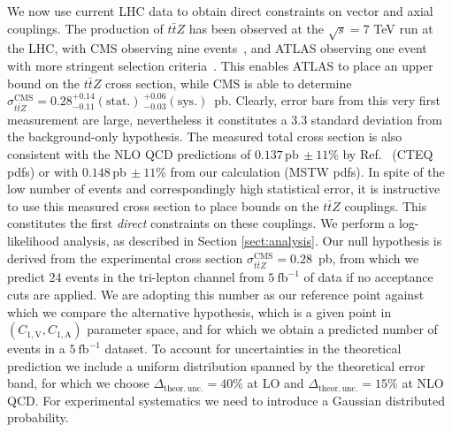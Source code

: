 \documentclass{JHEP3}
\def\ttbZ{t\bar{t}Z}
\def\invfb {\mathrm{fb}^{-1}}
\def\ConeA{C_{1,\mathrm{A}}}
\def\ConeV{C_{1,\mathrm{V}}}
\begin{document}
We now use current LHC data to obtain direct constraints on vector and axial couplings. The production of $\ttbZ$ has been observed at the $\sqrt{s}=7$ TeV run at the LHC, 
with CMS observing nine events~\cite{Chatrchyan:2013qca}, and ATLAS observing one event with more stringent selection criteria~\cite{ATLAS-CONF-2012-126}. 
This enables ATLAS to place an upper bound on the $\ttbZ$ cross section, 
while CMS is able to determine $\sigma_{\ttbZ}^{\mathrm{CMS}} = 0.28^{+0.14}_{-0.11}\mathrm{(stat.)}~^{+0.06}_{-0.03}\mathrm{(sys.)}$~pb. 
Clearly, error bars from this very first measurement are large, nevertheless it constitutes a 3.3 standard deviation from the background-only hypothesis.
The measured total cross section is also consistent with the NLO QCD predictions of $0.137\,$pb$\,\pm 11\%$ by Ref.~\cite{Garzelli:2011is} (CTEQ pdfs) 
or with $0.148\,$pb$\,\pm 11\%$ from our calculation (MSTW pdfs). 
In spite of the low number of events and correspondingly high statistical error, it is instructive to use this measured cross section to place bounds on the $\ttbZ$ couplings. 
This constitutes the first {\it direct} constraints on these couplings.
We perform a log-likelihood analysis, as described in Section \ref{sect:analysis}. 
Our null hypothesis is derived from the experimental cross section $\sigma_{\ttbZ}^{\mathrm{CMS}}=0.28$~pb, from which we predict 24 events in the tri-lepton channel 
from $5~\invfb$ of data if no acceptance cuts are applied. 
We are adopting this number as our reference point against which we compare the alternative hypothesis, 
which is a given point in $(\ConeV,\ConeA)$ parameter space, and for which we obtain a predicted number of events in a $5~\invfb$ dataset.
To account for uncertainties in the theoretical prediction we include a uniform distribution spanned by the theoretical error band, 
for which we choose $\Delta_\mathrm{theor.\,unc.} = 40\%$ at LO and $\Delta_\mathrm{theor.\,unc.} = 15\%$ at NLO QCD.
For experimental systematics we need to introduce a Gaussian distributed probability. 
\end{document}
